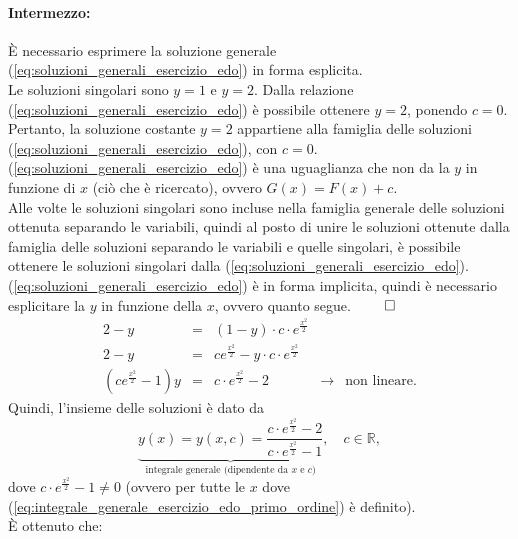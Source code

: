 \begin{example}
\begin{enumerate}
    \paragraph{Intermezzo:} È necessario esprimere la soluzione generale (\ref{eq:soluzioni_generali_esercizio_edo}) in forma esplicita.\\
    Le soluzioni singolari sono $y=1$ e $y=2$. Dalla relazione (\ref{eq:soluzioni_generali_esercizio_edo}) è possibile ottenere $y=2$, ponendo $c=0$. Pertanto, la soluzione costante $y=2$ appartiene alla famiglia delle soluzioni (\ref{eq:soluzioni_generali_esercizio_edo}), con $c=0$.\\
    (\ref{eq:soluzioni_generali_esercizio_edo}) è una uguaglianza che non da la $y$ in funzione di $x$ (ciò che è ricercato), ovvero $G(x) = F(x)+c$.\\
    Alle volte le soluzioni singolari sono incluse nella famiglia generale delle soluzioni ottenuta separando le variabili, quindi al posto di unire le soluzioni ottenute dalla famiglia delle soluzioni separando le variabili e quelle singolari, è possibile ottenere le soluzioni singolari dalla (\ref{eq:soluzioni_generali_esercizio_edo}).\\
    (\ref{eq:soluzioni_generali_esercizio_edo}) è in forma implicita, quindi è necessario esplicitare la $y$ in funzione della $x$, ovvero quanto segue. $\qed$
    \begin{equation*}
        \begin{matrix}
            2-y &=& (1-y)\cdot c\cdot e^{\frac{x^2}{2}}\\
            2-y &=& ce^{\frac{x^2}{2}} - y\cdot c\cdot e^{\frac{x^2}{2}}\\
            (ce^{\frac{x^2}{2}} -1)y &=& c\cdot e^{\frac{x^2}{2}}-2 &\rightarrow& \text{non lineare.}
        \end{matrix}
    \end{equation*}
    Quindi, l'insieme delle soluzioni è dato da
    \begin{equation}\label{eq:integrale_generale_esercizio_edo_primo_ordine}
        \underbrace{y(x) = y(x,c)=\frac{c\cdot e^{\frac{x^2}{2}}-2}{c\cdot e^{\frac{x^2}{2}}-1}}_{\text{integrale generale (dipendente da $x$ e $c$)}},\quad c\in\mathbb R,
    \end{equation}
    dove $c\cdot e^{\frac{x^2}{2}}-1\neq 0$ (ovvero per tutte le $x$ dove (\ref{eq:integrale_generale_esercizio_edo_primo_ordine}) è definito).\\
    È ottenuto che:
    \begin{itemize}

\end{itemize}
\end{enumerate}
\end{example}
